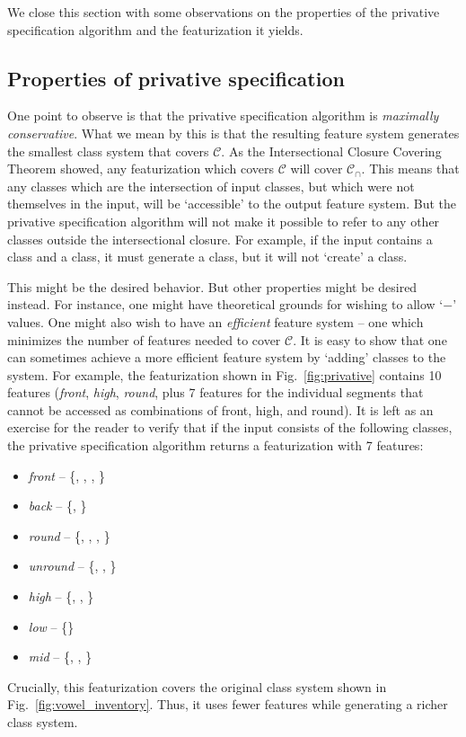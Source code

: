 \documentclass[11pt, oneside]{article}   	%
\begin{document}
We close this section with some observations on the properties of the privative specification algorithm and the featurization it yields. 

\subsection{Properties of privative specification}

One point to observe is that the privative specification algorithm is \textit{maximally conservative}. What we mean by this is that the resulting feature system generates the smallest class system that covers $\mathcal C$. As the Intersectional Closure Covering Theorem showed, any featurization which covers $\mathcal C$ will cover $\mathcal C_\cap$. This means that any classes which are the intersection of input classes, but which were not themselves in the input, will be `accessible' to the output feature system. But the privative specification algorithm will not make it possible to refer to any other classes outside the intersectional closure. For example, if the input contains a  class and a  class, it must generate a  class, but it will not `create' a  class.

This might be the desired behavior. But other properties might be desired instead. For instance, one might have theoretical grounds for wishing to allow `$-$' values. One might also wish to have an \textit{efficient} feature system -- one which minimizes the number of features needed to cover $\mathcal C$. It is easy to show that one can sometimes achieve a more efficient feature system by `adding' classes to the system. For example, the featurization shown in Fig.~\ref{fig:privative} contains 10 features (\textit{front}, \textit{high}, \textit{round}, plus 7 features for the individual segments that cannot be accessed as combinations of front, high, and round). It is left as an exercise for the reader to verify that if the input consists of the following classes, the privative specification algorithm returns a featurization with 7 features: \begin{itemize}
    \item \textit{front} -- \{, , , \textipa{\oe}\}
    \item \textit{back} -- \{, \}
    \item \textit{round} -- \{, , \textipa{\oe}, \}
    \item \textit{unround} -- \{, , \}
    \item \textit{high} --  \{, , \}
    \item \textit{low} -- \{\}
    \item \textit{mid} --  \{, \textipa{\oe}, \}
    \end{itemize}
Crucially, this featurization covers the original class system shown in Fig.~\ref{fig:vowel_inventory}. Thus, it uses fewer features while generating a richer class system.
\end{document}
